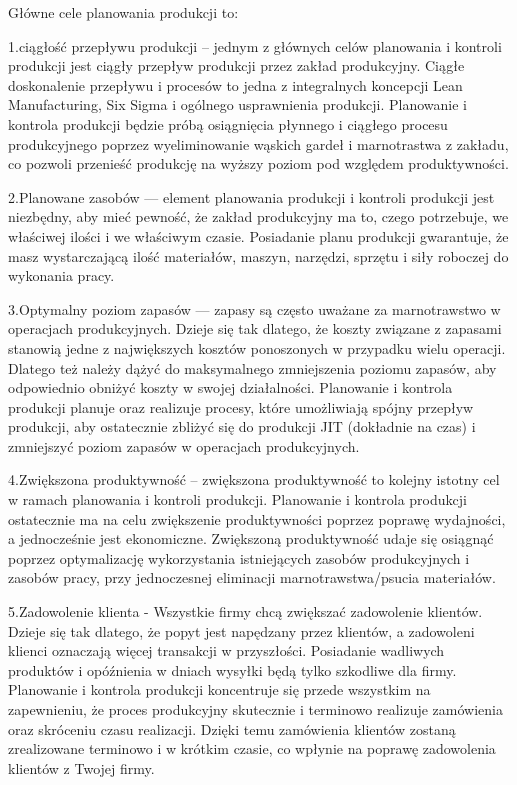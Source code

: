 Główne cele planowania produkcji to:

1.ciągłość przepływu produkcji – jednym z głównych celów planowania i kontroli produkcji jest ciągły przepływ produkcji przez zakład produkcyjny. Ciągłe doskonalenie przepływu i procesów to jedna z integralnych koncepcji Lean Manufacturing, Six Sigma i ogólnego usprawnienia produkcji. Planowanie i kontrola produkcji będzie próbą osiągnięcia płynnego i ciągłego procesu produkcyjnego poprzez wyeliminowanie wąskich gardeł i marnotrastwa z zakładu, co pozwoli  przenieść produkcję na wyższy poziom pod względem produktywności.

2.Planowane zasobów — element planowania produkcji i kontroli produkcji jest niezbędny, aby mieć pewność, że  zakład produkcyjny ma to, czego potrzebuje, we właściwej ilości i we właściwym czasie. Posiadanie planu produkcji gwarantuje, że masz wystarczającą ilość materiałów, maszyn, narzędzi, sprzętu i siły roboczej do wykonania pracy.


3.Optymalny poziom zapasów — zapasy są często uważane za marnotrawstwo w operacjach produkcyjnych. Dzieje się tak dlatego, że koszty związane z zapasami stanowią jedne z największych kosztów ponoszonych w przypadku wielu operacji. Dlatego też należy dążyć do maksymalnego zmniejszenia poziomu zapasów, aby odpowiednio obniżyć koszty w swojej działalności. Planowanie i kontrola produkcji planuje oraz realizuje procesy, które umożliwiają spójny przepływ produkcji, aby ostatecznie zbliżyć się do produkcji JIT (dokładnie na czas) i zmniejszyć poziom zapasów w operacjach produkcyjnych.

4.Zwiększona produktywność – zwiększona produktywność to kolejny istotny cel w ramach planowania i kontroli produkcji. Planowanie i kontrola produkcji ostatecznie ma na celu zwiększenie produktywności poprzez poprawę wydajności, a jednocześnie jest ekonomiczne. Zwiększoną produktywność udaje się osiągnąć poprzez optymalizację wykorzystania istniejących zasobów produkcyjnych i zasobów pracy, przy jednoczesnej eliminacji marnotrawstwa/psucia materiałów.

5.Zadowolenie klienta - Wszystkie firmy chcą zwiększać zadowolenie klientów. Dzieje się tak dlatego, że popyt jest napędzany przez klientów, a zadowoleni klienci oznaczają więcej transakcji w przyszłości. Posiadanie wadliwych produktów i opóźnienia w dniach wysyłki będą tylko szkodliwe dla firmy. Planowanie i kontrola produkcji koncentruje się przede wszystkim na zapewnieniu, że proces produkcyjny skutecznie i terminowo realizuje zamówienia oraz skróceniu czasu realizacji. Dzięki temu zamówienia klientów zostaną zrealizowane terminowo i w krótkim czasie, co wpłynie na poprawę zadowolenia klientów z Twojej firmy.






